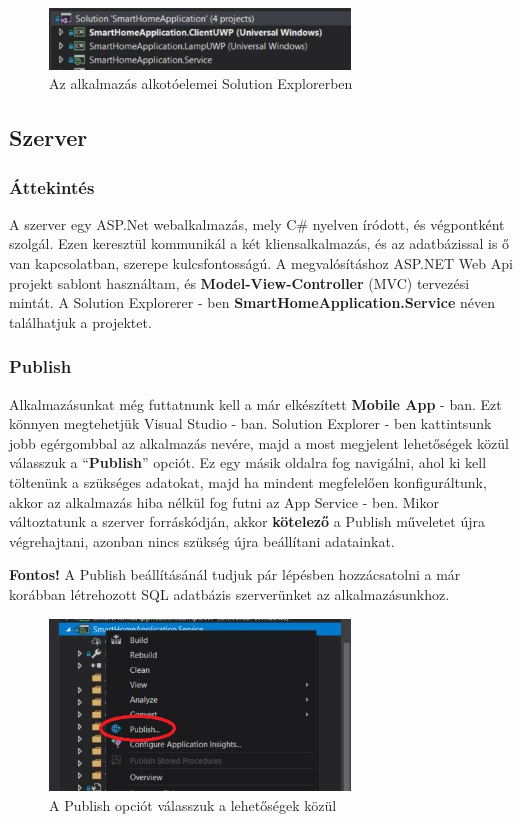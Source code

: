 \documentclass[a4paper,12pt]{report}
\begin{document}
\begin{figure}[H]
    \centering
    \includegraphics[width=8cm]{images/structure.jpg}
    \caption{Az alkalmazás alkotóelemei Solution Explorerben}
    \label{fig: SolutionExplorer}
\end{figure}

\subsection{Szerver}

\subsubsection{Áttekintés}
    A szerver egy ASP.Net webalkalmazás, mely C\# nyelven íródott, és végpontként szolgál. Ezen keresztül kommunikál a két kliensalkalmazás, és az adatbázissal
    is ő van kapcsolatban, szerepe kulcsfontosságú. A megvalósításhoz ASP.NET Web Api projekt sablont használtam, és \textbf{Model-View-Controller}
    (MVC) tervezési mintát. A Solution Explorerer - ben \textbf{SmartHomeApplication.Service} néven találhatjuk a projektet.

\subsubsection{Publish}
    Alkalmazásunkat még futtatnunk kell a már elkészített \textbf{Mobile App} - ban. Ezt könnyen megtehetjük Visual Studio - ban.
    Solution Explorer - ben kattintsunk jobb egérgombbal az alkalmazás nevére, majd a most megjelent lehetőségek közül válasszuk
    a ``\textbf{Publish}'' opciót. Ez egy másik oldalra fog navigálni, ahol ki kell töltenünk a szükséges adatokat, majd ha mindent
    megfelelően konfiguráltunk, akkor az alkalmazás hiba nélkül fog futni az App Service - ben.
    Mikor változtatunk a szerver forráskódján, akkor \textbf{kötelező} a Publish műveletet újra végrehajtani, azonban nincs szükség
    újra beállítani adatainkat.

    \textbf{Fontos!} A Publish beállításánál tudjuk pár lépésben hozzácsatolni a már korábban létrehozott SQL adatbázis szerverünket az alkalmazásunkhoz.

\begin{figure}[H]
    \centering
    \includegraphics[width=8cm]{images/publishbutton.jpg}
    \caption{A Publish opciót válasszuk a lehetőségek közül}
    \label{fig: Publish}
\end{figure}
\end{document}

